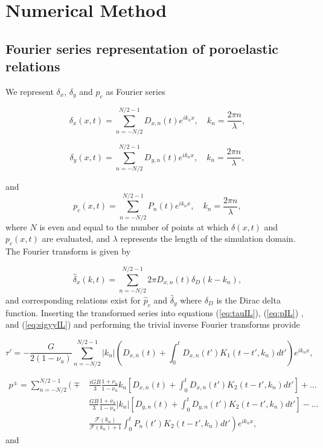 \documentclass[draft]{agujournal2019}
\begin{document}
\section{Numerical Method} \label{sec:num}

\subsection{Fourier series representation of poroelastic relations}	\label{sec:Fser}

We represent $\delta_x$, $\delta_y$ and $p_c$ as Fourier series

\begin{equation}
    \delta_x (x,t) = \sum_{n = -N/2}^{N/2 - 1} D_{x,n}(t) e^{ik_n x}, \quad k_n = \frac{2 \pi n}{\lambda},
\end{equation}

\begin{equation}
    \delta_y (x,t) = \sum_{n = -N/2}^{N/2 - 1} D_{y,n}(t) e^{ik_n x}, \quad k_n = \frac{2 \pi n}{\lambda},
\end{equation}

and
\begin{equation}
    p_c(x,t) = \sum_{n = -N/2}^{N/2 - 1} P_n(t) e^{ik_n x}, \quad k_n = \frac{2 \pi n}{\lambda},
\end{equation}
where $N$ is even and equal to the number of points at which $\delta(x,t)$ and $p_c(x,t)$ are evaluated, and $\lambda$ represents the length of the simulation domain. The Fourier transform is given by 

\begin{equation}
    \hat{\delta}_x(k,t) = \sum_{n = -N/2}^{N/2 - 1} 2 \pi D_{x,n}(t) \delta_D(k - k_n),
\end{equation}
and corresponding relations exist for $\hat{p}_c$ and $\hat{\delta}_y$ where $\delta_D$ is the Dirac delta function. Inserting the transformed series into equations (\ref{eq:tauIL}), (\ref{eq:pIL}) , and (\ref{eq:sigyyIL}) and performing the trivial inverse Fourier transforms provide

\begin{equation}
\tau' = -  \frac{G}{2(1-\nu_u)}  \sum_{n = -N/2}^{N/2 - 1}   |k_n| \left(D_{x,n}(t) + \int_0^t D_{x,n}(t') K_1 (t - t',k_n) dt' \right) e^{ik_n x},
\label{eq:tauS}
\end{equation}	

\begin{align}
p^\pm =   \sum_{n = -N/2}^{N/2 - 1}  \bigg( \mp & \frac{i G B }{3} \frac{1+\nu_u}{1-\nu_u} k_n \left[ D_{x,n}(t) + \int_0^t D_{x,n}(t') K_2 (t - t',k_n) dt' \right] + \ldots \nonumber \\ 
 & \frac{G B }{3} \frac{1+\nu_u}{1-\nu_u} |k_n| \left[ D_{y,n}(t) + \int_0^t D_{y,n}(t') K_2 (t - t',k_n) dt'  \right] - \dots \nonumber  \\ 
& \left. \frac{  \mathcal{F}(k_n) }{\mathcal{F}(k_n) + 1} \int_0^t P_n(t') K_2 (t - t',k_n) dt'    \right) e^{ik_n x} ,
\label{eq:pS}
\end{align}	
and
\end{document}
